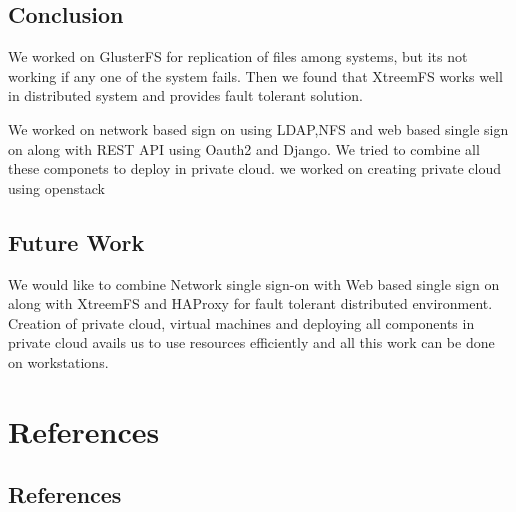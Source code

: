 \documentclass[12pt]{report}
\begin{document}
\section{Conclusion} 

\hspace{0.5cm} We worked on GlusterFS for replication of files among systems, but its not working if any one of the system fails. Then we found that XtreemFS works well in distributed system and provides fault tolerant solution. \newline

We worked on network based sign on using LDAP,NFS and web based single sign on along with REST API using Oauth2 and Django. We tried to combine all these componets to deploy in private cloud. we worked on creating private cloud using openstack \newline

\section{Future Work}
\hspace{0.5cm} We would like to combine Network single sign-on with Web based single sign on along with XtreemFS and HAProxy for fault tolerant distributed environment. Creation of private cloud, virtual machines and deploying all components in private cloud avails us to use resources efficiently and all this work can be done on workstations.


\chapter{References}

\section{References}
\end{document}
